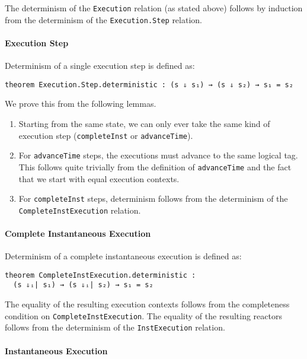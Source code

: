 The determinism of the \lstinline{Execution} relation (as stated above) follows by induction from the determinism of the \lstinline{Execution.Step} relation.

\paragraph{Execution Step}

Determinism of a single execution step is defined as:

\begin{lstlisting}
theorem Execution.Step.deterministic : (s ⇓ s₁) → (s ⇓ s₂) → s₁ = s₂
\end{lstlisting}

We prove this from the following lemmas. 

\begin{enumerate}
  \item Starting from the same state, we can only ever take the same kind of execution step (\lstinline{completeInst} or \lstinline{advanceTime}).
  \item For \lstinline{advanceTime} steps, the executions must advance to the same logical tag. 
        This follows quite trivially from the definition of \lstinline{advanceTime} and the fact that we start with equal execution contexts.
  \item For \lstinline{completeInst} steps, determinism follows from the determinism of the \lstinline{CompleteInstExecution} relation.
\end{enumerate}

\paragraph{Complete Instantaneous Execution}

Determinism of a complete instantaneous execution is defined as:

\begin{lstlisting}
theorem CompleteInstExecution.deterministic : 
  (s ⇓ᵢ| s₁) → (s ⇓ᵢ| s₂) → s₁ = s₂
\end{lstlisting}

The equality of the resulting execution contexts follows from the completeness condition on \lstinline{CompleteInstExecution}.
The equality of the resulting reactors follows from the determinism of the \lstinline{InstExecution} relation.

\paragraph{Instantaneous Execution}


